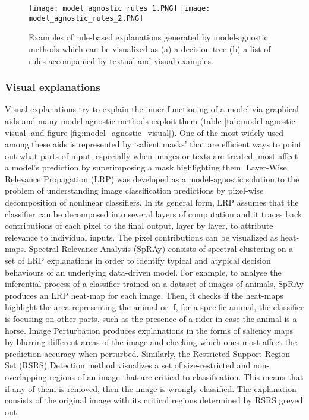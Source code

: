 \documentclass[final,1p,times]{elsarticle}
\begin{document}
\begin{figure}[!ht]
\begin{minipage}{\textwidth}
\centering
    {\texttt{[image: model\_agnostic\_rules\_1.PNG]}}
    {\texttt{[image: model\_agnostic\_rules\_2.PNG]}}
  \caption{Examples of rule-based explanations generated by model-agnostic methods which can be visualized as (a) a decision tree (b) a list of rules accompanied by textual and visual examples.}
  \label{fig:model_agnostic_rules}
\end{minipage}
\end{figure}


\subsubsection{Visual explanations}
Visual explanations try to explain the inner functioning of a model via graphical aids and many model-agnostic methods exploit them (table \ref{tab:model-agnostic-visual} and figure \ref{fig:model_agnostic_visual}). 
One of the most widely used among these aids is represented by `salient masks' that are efficient ways to point out what parts of input, especially when images or texts are treated, most affect a model's prediction by superimposing a mask highlighting them. 
Layer-Wise Relevance Propagation (LRP) \cite{bach2015pixel} was developed as a model-agnostic solution to the problem of understanding image classification predictions by pixel-wise decomposition of nonlinear classifiers. In its general form, LRP assumes that the classifier can be decomposed into several layers of computation and it traces back contributions of each pixel to the final output, layer by layer, to attribute relevance to individual inputs. The pixel contributions can be visualized as heat-maps.
Spectral Relevance Analysis (SpRAy) \cite{lapuschkin2019unmasking} consists of spectral clustering on a set of LRP explanations in order to identify typical and atypical decision behaviours of an underlying data-driven model. For example, to analyse the inferential process of a classifier trained on a dataset of images of animals, SpRAy produces an LRP heat-map for each image. Then, it checks if the heat-maps highlight the area representing the animal or if, for a specific animal, the classifier is focusing on other parts, such as the presence of a rider in case the animal is a horse.
Image Perturbation \cite{fong2017interpretable} produces explanations in the forms of saliency maps by blurring different areas of the image and checking which ones most affect the prediction accuracy when perturbed. Similarly, the Restricted Support Region Set (RSRS) Detection method \cite{liu2012has} visualizes a set of size-restricted and non-overlapping regions of an image that are critical to classification. This means that if any of them is removed, then the image is wrongly classified. The explanation consists of the original image with its critical regions determined by RSRS greyed out.
\end{document}
